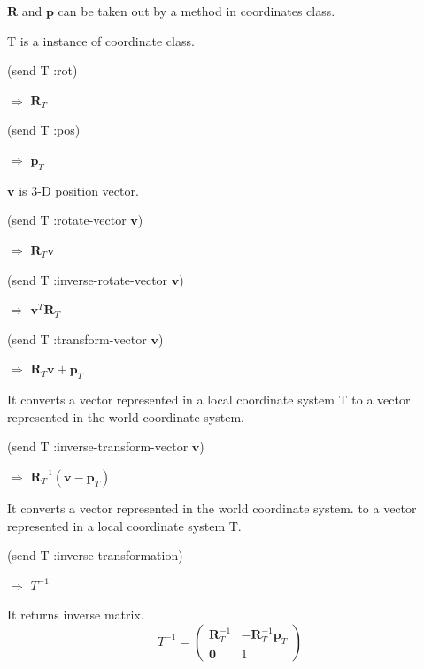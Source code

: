 \vspace{1ex}

\noindent
$\mathbf{R}$ and $\mathbf{p}$ can be taken out by a method in coordinates class.

\noindent
T is a instance of coordinate class.

\noindent
(send T :rot)

$\Rightarrow$ $\mathbf{R}_T$

\noindent
(send T :pos)

$\Rightarrow$ $\mathbf{p}_T$

\vspace{1ex}

\noindent
$\mathbf{v}$ is 3-D position vector.

\noindent
(send T :rotate-vector $\mathbf{v}$)

$\Rightarrow$  $\mathbf{R}_T \mathbf{v}$

\noindent
(send T :inverse-rotate-vector $\mathbf{v}$)

$\Rightarrow$ $\mathbf{v}^T \mathbf{R}_T$

\noindent
(send T :transform-vector $\mathbf{v}$)

$\Rightarrow$ $\mathbf{R}_T\mathbf{v} + \mathbf{p}_T$

It converts a vector represented in a local coordinate system T
to a vector represented in the world coordinate system.

\noindent
(send T :inverse-transform-vector $\mathbf{v}$)

$\Rightarrow$ $\mathbf{R}_T^{-1}\left( \mathbf{v} - \mathbf{p}_T \right)$

It converts a vector represented in the world coordinate system.
to a vector represented in a local coordinate system T.

\vspace{1ex}

\noindent
(send T :inverse-transformation)

$\Rightarrow$ $T^{-1}$

It returns inverse matrix.
\[
T^{-1} = \begin{pmatrix}
 \mathbf{R}_T^{-1} & -\mathbf{R}_T^{-1}\mathbf{p}_T \\
 \mathbf{0} & 1
\end{pmatrix}
\]

